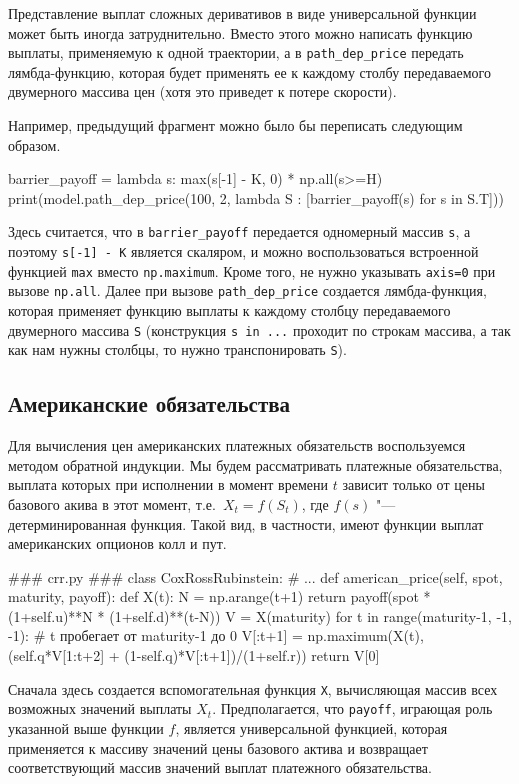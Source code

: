 \begin{remark}
Представление выплат сложных деривативов в виде универсальной функции может быть иногда затруднительно.
Вместо этого можно написать функцию выплаты, применяемую к одной траектории, а в \verb"path_dep_price" передать лямбда-функцию, которая будет применять ее к каждому столбу передаваемого двумерного массива цен (хотя это приведет к потере скорости).

Например, предыдущий фрагмент можно было бы переписать следующим образом.
\begin{python}
barrier_payoff = lambda s: max(s[-1] - K, 0) * np.all(s>=H)
print(model.path_dep_price(100, 2, lambda S : [barrier_payoff(s) for s in S.T]))
\end{python}
Здесь считается, что в \verb"barrier_payoff" передается одномерный массив \verb"s", а поэтому \verb"s[-1] - K" является скаляром, и можно воспользоваться встроенной функцией \verb"max" вместо \verb"np.maximum".
Кроме того, не нужно указывать \verb"axis=0" при вызове \verb"np.all". 
Далее при вызове \verb"path_dep_price" создается лямбда-функция, которая применяет функцию выплаты к каждому столбцу передаваемого двумерного массива \verb"S" (конструкция \verb"s in ..." проходит по строкам массива, а так как нам нужны столбцы, то нужно транспонировать \verb"S").
\end{remark}


\subsection{Американские обязательства}
Для вычисления цен американских платежных обязательств воспользуемся методом обратной индукции.
Мы будем рассматривать платежные обязательства, выплата которых при исполнении в момент времени $t$ зависит только от цены базового акива в этот момент, т.е.\ $X_t=f(S_t)$, где $f(s)$ "--- детерминированная функция.
Такой вид, в частности, имеют функции выплат американских опционов колл и пут.
\begin{python}
### crr.py ###
class CoxRossRubinstein:
    # ...
    def american_price(self, spot, maturity, payoff):
        def X(t):
            N = np.arange(t+1)
            return payoff(spot * (1+self.u)**N * (1+self.d)**(t-N))
        V = X(maturity)
        for t in range(maturity-1, -1, -1):  # t пробегает от maturity-1 до 0
            V[:t+1] = np.maximum(X(t),
                (self.q*V[1:t+2] + (1-self.q)*V[:t+1])/(1+self.r))
        return V[0]    
\end{python}
Сначала здесь создается вспомогательная функция \verb"X", вычисляющая массив всех возможных значений выплаты $X_t$.
Предполагается, что \verb"payoff", играющая роль указанной выше функции $f$, является универсальной функцией, которая применяется к массиву значений цены базового актива и возвращает соответствующий массив значений выплат платежного обязательства. 

